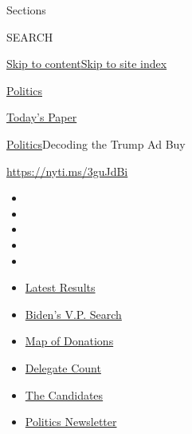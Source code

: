 Sections

SEARCH

\protect\hyperlink{site-content}{Skip to
content}\protect\hyperlink{site-index}{Skip to site index}

\href{https://www.nytimes.com/section/politics}{Politics}

\href{https://myaccount.nytimes.com/auth/login?response_type=cookie\&client_id=vi}{}

\href{https://www.nytimes.com/section/todayspaper}{Today's Paper}

\href{/section/politics}{Politics}\textbar{}Decoding the Trump Ad Buy

\url{https://nyti.ms/3guJdBi}

\begin{itemize}
\item
\item
\item
\item
\item
\end{itemize}

\begin{itemize}
\item
  \href{https://www.nytimes.com/interactive/2020/08/04/us/elections/results-arizona-kansas-michigan-missouri-primaries.html?action=click\&pgtype=Article\&state=default\&region=TOP_BANNER\&context=storylines_menu}{Latest
  Results}
\item
  \href{https://www.nytimes.com/article/biden-vice-president-2020.html?action=click\&pgtype=Article\&state=default\&region=TOP_BANNER\&context=storylines_menu}{Biden's
  V.P. Search}
\item
  \href{https://www.nytimes.com/interactive/2020/07/24/us/politics/trump-biden-campaign-donors.html?action=click\&pgtype=Article\&state=default\&region=TOP_BANNER\&context=storylines_menu}{Map
  of Donations}
\item
  \href{https://www.nytimes.com/interactive/2020/us/elections/delegate-count-primary-results.html?action=click\&pgtype=Article\&state=default\&region=TOP_BANNER\&context=storylines_menu}{Delegate
  Count}
\item
  \href{https://www.nytimes.com/interactive/2019/us/politics/2020-presidential-candidates.html?action=click\&pgtype=Article\&state=default\&region=TOP_BANNER\&context=storylines_menu}{The
  Candidates}
\item
  \href{https://www.nytimes.com/newsletters/politics?action=click\&pgtype=Article\&state=default\&region=TOP_BANNER\&context=storylines_menu}{Politics
  Newsletter}
\end{itemize}

